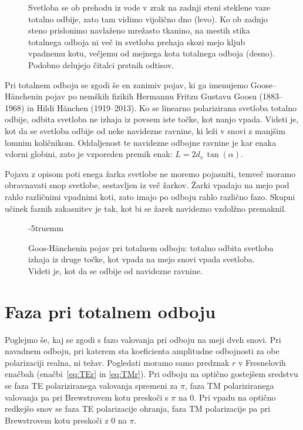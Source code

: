 \begin{figure}[ht]
\caption{Svetloba se ob prehodu iz vode v zrak na zadnji steni steklene vaze 
totalno odbije, zato tam vidimo vijolično dno (levo). Ko ob zadnjo steno prislonimo
navlaženo mrežasto tkanino, na mestih stika totalnega odboja ni več in svetloba prehaja
skozi mejo kljub vpadnemu kotu, večjemu od mejnega kota totalnega odboja (desno).
Podobno delujejo čitalci prstnih odtisov.}
\label{fig:04_FTIRfoto}

\end{figure}
\begin{remark}
Pri totalnem odboju se zgodi še en zanimiv pojav, ki ga imenujemo Goose--H\"anchenin pojav 
po nemških fizikih Hermannu Fritzu Gustavu Goosu (1883--1968) in Hildi H\"anchen (1919--2013).
Ko se linearno polarizirana svetloba totalno odbije, odbita svetloba ne izhaja iz 
povsem iste točke, kot nanjo vpada. Videti je, kot da se svetloba odbije od neke 
navidezne ravnine, ki leži v snovi z manjšim lomnim količnikom. 
Oddaljenost te navidezne odbojne ravnine je kar enaka vdorni globini, 
zato je vzporeden premik enak: $L = 2d_v\,\tan(\alpha)$.

Pojava z opisom poti enega žarka svetlobe ne moremo pojasniti, temveč moramo
obravnavati snop svetlobe, sestavljen iz več žarkov. Žarki vpadajo na mejo pod rahlo
različnimi vpadnimi koti, zato imajo po odboju rahlo različno fazo. Skupni 
učinek faznih zakasnitev je tak, kot bi se žarek navidezno vzdolžno premaknil. 
\begin{figure}[ht]
\centering
\def\svgwidth{70truemm} 

\caption{Goos-H\"anchenin pojav pri totalnem odboju: totalno odbita svetloba izhaja iz druge točke, 
kot vpada na mejo snovi vpada svetloba. Videti je, kot da se odbije od navidezne ravnine.}
\label{fig:04_Goos}
\vglue-5truemm\end{figure}
\end{remark}

\section{Faza pri totalnem odboju}
Poglejmo še, kaj se zgodi s fazo valovanja pri odboju na meji dveh snovi. 
Pri navadnem odboju, pri katerem sta koeficienta
amplitudne odbojnosti za obe polarizaciji realna, ni težav. 
Pogledati moramo samo predznak $r$ v Fresnelovih enačbah (enačbi~\ref{eq:TEr} 
in \ref{eq:TMr}). Pri odboju na 
optično gostejšem sredstvu se faza TE polariziranega valovanja 
spremeni za $\pi$, faza TM polariziranega
valovanja pa pri Brewstrovem kotu preskoči s $\pi$ na 0. 
Pri vpadu na optično redkejšo snov se faza
TE polarizacije ohranja, faza TM polarizacije pa pri 
Brewstrovem kotu preskoči z 0 na $\pi$.  

